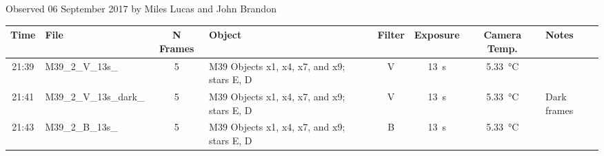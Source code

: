 \caption{Observed 06 September 2017 by Miles Lucas and John Brandon}
\begin{tabular}{clclcccl}
	\hline
	Time  & File                   & N Frames & Object                                     & Filter &     Exposure     &       Camera Temp.        & Notes       \\ \hline\hline
	21:39 & M39\_2\_V\_13s\_       &    5     & M39 Objects x1, x4, x7, and x9; stars E, D &   V    & \SI{13}{\second} & \SI{5.33}{\degreeCelsius} &             \\
	21:41 & M39\_2\_V\_13s\_dark\_ &    5     & M39 Objects x1, x4, x7, and x9; stars E, D &   V    & \SI{13}{\second} & \SI{5.33}{\degreeCelsius} & Dark frames \\
	21:43 & M39\_2\_B\_13s\_       &    5     & M39 Objects x1, x4, x7, and x9; stars E, D &   B    & \SI{13}{\second} & \SI{5.33}{\degreeCelsius} &             \\ \hline
\end{tabular}
